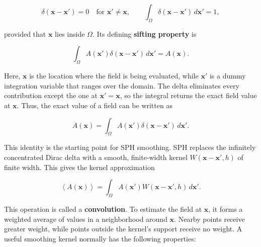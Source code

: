\documentclass[11pt]{article}
\begin{document}
\begin{equation}
    \delta(\mathbf{x}-\mathbf{x}') = 0
    \quad \text{for } \mathbf{x}' \ne \mathbf{x},
    \qquad
    \int_{\Omega} \delta(\mathbf{x}-\mathbf{x}')\,d\mathbf{x}' = 1,
\end{equation}

provided that $\mathbf{x}$ lies inside $\Omega$. Its defining
\textbf{sifting property} is

\begin{equation}
    \int_{\Omega} A(\mathbf{x}')
    \delta(\mathbf{x}-\mathbf{x}')\,d\mathbf{x}' = A(\mathbf{x}).
\end{equation}

Here, $\mathbf{x}$ is the location where the field is being evaluated, while
$\mathbf{x}'$ is a dummy integration variable that ranges over the domain.
The delta eliminates every contribution except the one at
$\mathbf{x}'=\mathbf{x}$, so the integral returns the exact field value at
$\mathbf{x}$. Thus, the exact value of a field can be written as

\begin{equation}
    A(\mathbf{x})
    = \int_{\Omega} A(\mathbf{x}')
    \delta(\mathbf{x} - \mathbf{x}')\,d\mathbf{x}'.
\end{equation}

This identity is the starting point for SPH smoothing. SPH replaces the
infinitely concentrated Dirac delta with a smooth, finite-width kernel
$W(\mathbf{x} - \mathbf{x}', h)$ of finite width. This gives the kernel
approximation

\begin{equation}
    \left\langle A(\mathbf{x}) \right\rangle
    = \int_{\Omega} A(\mathbf{x}')
    W(\mathbf{x} - \mathbf{x}', h)\,d\mathbf{x}'.
\end{equation}

This operation is called a \textbf{convolution}. To estimate the field at
$\mathbf{x}$, it forms a weighted average of values in a neighborhood around
$\mathbf{x}$. Nearby points receive greater weight, while points outside the
kernel's support receive no weight. A useful smoothing kernel normally has the
following properties:
\end{document}
